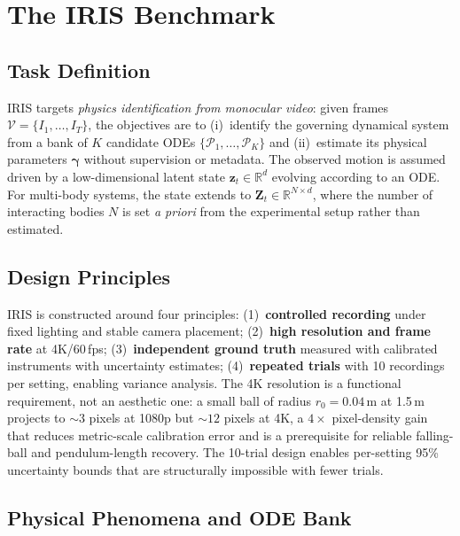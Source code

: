 \documentclass[runningheads]{llncs}
\begin{document}
\section{The IRIS Benchmark}
\label{sec:dataset}

\subsection{Task Definition}
\label{sec:task}

IRIS targets \emph{physics identification from monocular video}: given frames $\mathcal{V} = \{I_1, \ldots, I_T\}$, the objectives are to (i)~identify the governing dynamical system from a bank of $K$ candidate ODEs $\{\mathcal{P}_1, \ldots, \mathcal{P}_K\}$ and (ii)~estimate its physical parameters $\boldsymbol{\gamma}$ without supervision or metadata. The observed motion is assumed driven by a low-dimensional latent state $\mathbf{z}_t \in \mathbb{R}^d$ evolving according to an ODE. For multi-body systems, the state extends to $\mathbf{Z}_t \in \mathbb{R}^{N \times d}$, where the number of interacting bodies $N$ is set \emph{a priori} from the experimental setup rather than estimated.

\subsection{Design Principles}
\label{sec:dataset_design}

IRIS is constructed around four principles: (1)~\textbf{controlled recording} under fixed lighting and stable camera placement; (2)~\textbf{high resolution and frame rate} at 4K/60\,fps; (3)~\textbf{independent ground truth} measured with calibrated instruments with uncertainty estimates; (4)~\textbf{repeated trials} with 10 recordings per setting, enabling variance analysis. The 4K resolution is a functional requirement, not an aesthetic one: a small ball of radius $r_0{=}0.04$\,m at 1.5\,m projects to ${\sim}3$ pixels at 1080p but ${\sim}12$ pixels at 4K, a $4\times$ pixel-density gain that reduces metric-scale calibration error and is a prerequisite for reliable falling-ball and pendulum-length recovery. The 10-trial design enables per-setting 95\% uncertainty bounds that are structurally impossible with fewer trials.

\subsection{Physical Phenomena and ODE Bank}
\label{sec:dataset_phenomena}
\end{document}

